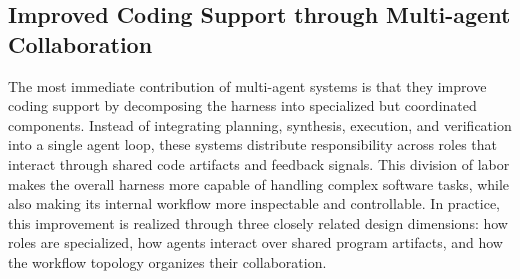 \subsection{Improved Coding Support through Multi-agent Collaboration}

The most immediate contribution of multi-agent systems is that
they improve coding support by decomposing the harness into
specialized but coordinated components. Instead of integrating
planning, synthesis, execution, and verification into a single
agent loop, these systems distribute responsibility across roles
that interact through shared code artifacts and feedback signals.
This division of labor makes the overall harness more capable of
handling complex software tasks, while also making its internal
workflow more inspectable and controllable. In practice, this
improvement is realized through three closely related design
dimensions: how roles are specialized, how agents interact over
shared program artifacts, and how the workflow topology organizes
their collaboration.




